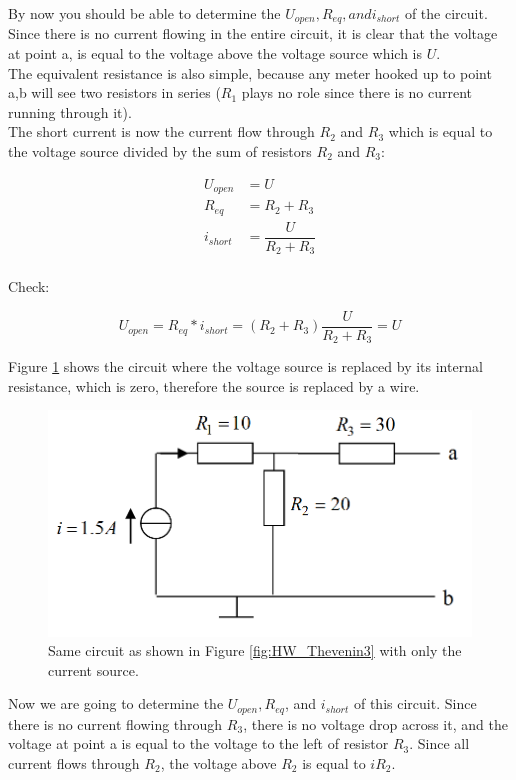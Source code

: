 \documentclass[11pt,letterpaper]{article}
\begin{document}
By now you should be able to determine the $U_{open}, R_{eq}, and i_{short}$ of the circuit. Since there is no current flowing in the entire circuit, it is clear that the voltage at point a, is equal to the voltage above the voltage source which is $U$.\\

The equivalent resistance is also simple, because any meter hooked up to point a,b will see two resistors in series ($R_1$ plays no role since there is no current running through it).\\

The short current is now the current flow through $R_2$ and $R_3$ which is equal to the voltage source divided by the sum of resistors  $R_2$ and $R_3$:

\begin{align}\label{Eqn:HW_Thevenin3}
U_{open} &= U \\
R_{eq}  &= R_2 + R_3 \\
i_{short} &=  \dfrac{U}{R_2+R_3}\\
\end{align}

Check:

\begin{equation}
U_{open} = R_{eq} * i_{short} = \left( R_2 + R_3 \right) \dfrac{U}{R_2+R_3} = U
\end{equation}


Figure \ref{fig:HW_Thevenin3_CurrentSource} shows the circuit where the voltage source is replaced by its internal resistance, which is zero, therefore the source is replaced by a wire.\\

\begin{figure}
\centering
\includegraphics[width=0.65\linewidth]{HW_Thevenin3_CurrentSource}
\caption{Same circuit as shown in Figure \ref{fig:HW_Thevenin3} with only the current source.}
\label{fig:HW_Thevenin3_CurrentSource}
\end{figure}

Now we are going to determine the $U_{open}, R_{eq}$, and $i_{short}$ of this circuit. Since there is no current flowing through $R_3$, there is no voltage drop across it, and the voltage at point a is equal to the voltage to the left of resistor $R_3$. Since all current flows through $R_2$, the voltage above $R_2$ is equal to $i R_2$.\\
\end{document}
